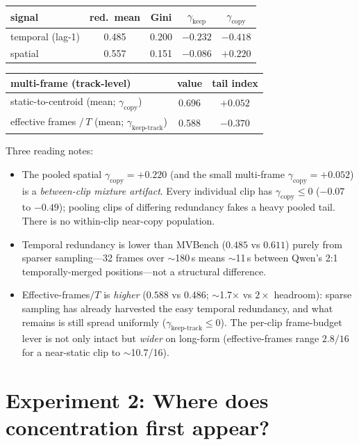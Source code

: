 \documentclass[11pt]{article}
\newcommand{\gkeep}{\gamma_{\mathrm{keep}}}
\newcommand{\gcopy}{\gamma_{\mathrm{copy}}}
\begin{document}
\begin{center}
\begin{tabular}{lcccc}
\toprule
signal & red.\ mean & Gini & $\gkeep$ & $\gcopy$ \\
\midrule
temporal (lag-1) & 0.485 & 0.200 & $-0.232$ & $-0.418$ \\
spatial          & 0.557 & 0.151 & $-0.086$ & $+0.220$ \\
\bottomrule
\end{tabular}
\end{center}

\begin{center}
\begin{tabular}{lcc}
\toprule
multi-frame (track-level) & value & tail index \\
\midrule
static-to-centroid (mean; $\gcopy$)        & 0.696 & $+0.052$ \\
effective frames $/\,T$ (mean; $\gamma_{\mathrm{keep\text{-}track}}$) & 0.588 & $-0.370$ \\
\bottomrule
\end{tabular}
\end{center}

Three reading notes:
\begin{itemize}
\item The pooled spatial $\gcopy=+0.220$ (and the small multi-frame $\gcopy=+0.052$) is a
      \emph{between-clip mixture artifact}. Every individual clip has $\gcopy\le0$ ($-0.07$
      to $-0.49$); pooling clips of differing redundancy fakes a heavy pooled tail. There
      is no within-clip near-copy population.
\item Temporal redundancy is lower than MVBench ($0.485$ vs $0.611$) purely from sparser
      sampling---32 frames over $\sim$180\,s means $\sim$11\,s between Qwen's 2:1
      temporally-merged positions---not a structural difference.
\item Effective-frames$/T$ is \emph{higher} ($0.588$ vs $0.486$; $\sim$1.7$\times$ vs
      $2\times$ headroom): sparse sampling has already harvested the easy temporal
      redundancy, and what remains is still spread uniformly
      ($\gamma_{\mathrm{keep\text{-}track}}\le0$). The per-clip frame-budget lever is not
      only intact but \emph{wider} on long-form (effective-frames range $2.8/16$ for a
      near-static clip to $\sim$10.7/16).
\end{itemize}

\section{Experiment 2: Where does concentration first appear?}
\end{document}
